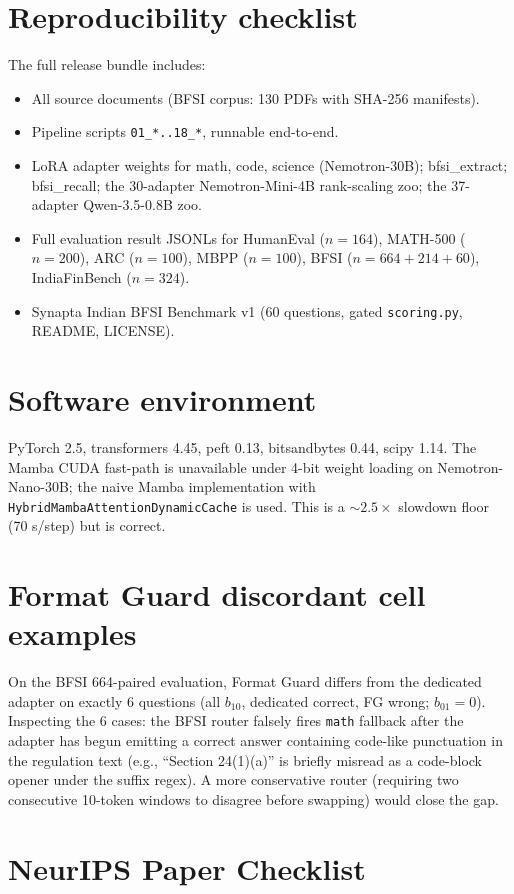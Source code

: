 \documentclass{article}
\begin{document}
\section{Reproducibility checklist}
The full release bundle includes:
\begin{itemize}[leftmargin=*]
  \item All source documents (BFSI corpus: 130 PDFs with SHA-256 manifests).
  \item Pipeline scripts \texttt{01\_*..18\_*}, runnable end-to-end.
  \item LoRA adapter weights for math, code, science (Nemotron-30B); bfsi\_extract; bfsi\_recall; the 30-adapter Nemotron-Mini-4B rank-scaling zoo; the 37-adapter Qwen-3.5-0.8B zoo.
  \item Full evaluation result JSONLs for HumanEval ($n=164$), MATH-500 ($n=200$), ARC ($n=100$), MBPP ($n=100$), BFSI ($n=664 + 214 + 60$), IndiaFinBench ($n=324$).
  \item Synapta Indian BFSI Benchmark v1 (60 questions, gated \texttt{scoring.py}, README, LICENSE).
\end{itemize}

\section{Software environment}
PyTorch 2.5, transformers 4.45, peft 0.13, bitsandbytes 0.44, scipy 1.14. The Mamba CUDA fast-path is unavailable under 4-bit weight loading on Nemotron-Nano-30B; the naive Mamba implementation with \texttt{HybridMambaAttentionDynamicCache} is used. This is a $\sim 2.5\times$ slowdown floor (70 s/step) but is correct.

\section{Format Guard discordant cell examples}
On the BFSI 664-paired evaluation, Format Guard differs from the dedicated adapter on exactly 6 questions (all $b_{10}$, dedicated correct, FG wrong; $b_{01}=0$). Inspecting the 6 cases: the BFSI router falsely fires \texttt{math} fallback after the adapter has begun emitting a correct answer containing code-like punctuation in the regulation text (e.g., ``Section 24(1)(a)'' is briefly misread as a code-block opener under the suffix regex). A more conservative router (requiring two consecutive 10-token windows to disagree before swapping) would close the gap.


\section*{NeurIPS Paper Checklist}
\end{document}
